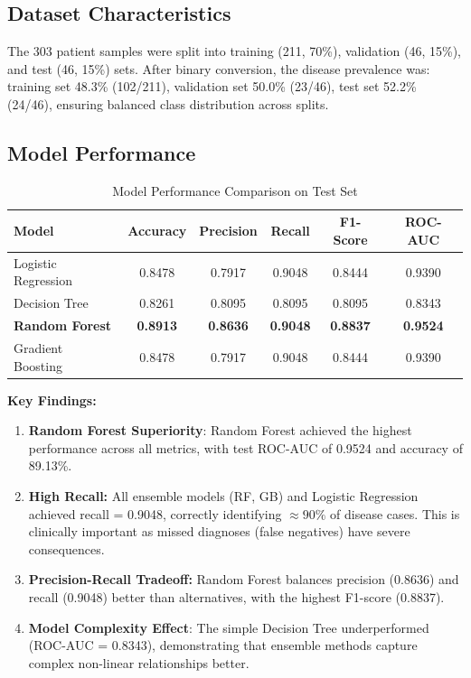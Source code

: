 \documentclass[journal]{IEEEtran}
\begin{document}
\subsection{Dataset Characteristics}

The 303 patient samples were split into training (211, 70\%), validation (46, 15\%), and test (46, 15\%) sets. After binary conversion, the disease prevalence was: training set 48.3\% (102/211), validation set 50.0\% (23/46), test set 52.2\% (24/46), ensuring balanced class distribution across splits.

\subsection{Model Performance}

\begin{table}[h]
\centering
\caption{Model Performance Comparison on Test Set}
\label{tab:performance}
\begin{tabular}{l|ccccc}
\toprule
\textbf{Model} & \textbf{Accuracy} & \textbf{Precision} & \textbf{Recall} & \textbf{F1-Score} & \textbf{ROC-AUC} \\
\midrule
Logistic Regression & 0.8478 & 0.7917 & 0.9048 & 0.8444 & 0.9390 \\
Decision Tree & 0.8261 & 0.8095 & 0.8095 & 0.8095 & 0.8343 \\
\textbf{Random Forest} & \textbf{0.8913} & \textbf{0.8636} & \textbf{0.9048} & \textbf{0.8837} & \textbf{0.9524} \\
Gradient Boosting & 0.8478 & 0.7917 & 0.9048 & 0.8444 & 0.9390 \\
\bottomrule
\end{tabular}
\end{table}

\textbf{Key Findings:}

\begin{enumerate}
    \item \textbf{Random Forest Superiority}: Random Forest achieved the highest performance across all metrics, with test ROC-AUC of 0.9524 and accuracy of 89.13\%.
    
    \item \textbf{High Recall:} All ensemble models (RF, GB) and Logistic Regression achieved recall = 0.9048, correctly identifying $\approx 90\%$ of disease cases. This is clinically important as missed diagnoses (false negatives) have severe consequences.
    
    \item \textbf{Precision-Recall Tradeoff:} Random Forest balances precision (0.8636) and recall (0.9048) better than alternatives, with the highest F1-score (0.8837).
    
    \item \textbf{Model Complexity Effect}: The simple Decision Tree underperformed (ROC-AUC = 0.8343), demonstrating that ensemble methods capture complex non-linear relationships better.
\end{enumerate}
\end{document}
